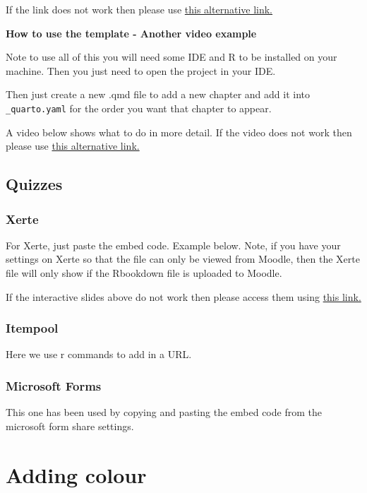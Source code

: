 \documentclass[
  letterpaper,
  oneside]{book}
\numberwithin{equation}{section}
\numberwithin{figure}{section}
\theoremstyle{break}
\theoremstyle{plain}
\theoremstyle{remark}
\begin{document}
If the link does not work then please use
\href{https://mediaspace.nottingham.ac.uk/media/How+to+get+the+embed+links/1_824b1mfn}{this
alternative link.}

\textbf{How to use the template - Another video example}

Note to use all of this you will need some IDE and R to be installed on
your machine. Then you just need to open the project in your IDE.

Then just create a new .qmd file to add a new chapter and add it into
\texttt{\_quarto.yaml} for the order you want that chapter to appear.

A video below shows what to do in more detail. If the video does not
work then please use
\href{https://mediaspace.nottingham.ac.uk/media/How+to+use+the+template/1_brjfqb44}{this
alternative link.}

\section{Quizzes}\label{quizzes}

\subsection{Xerte}\label{xerte}

For Xerte, just paste the embed code. Example below. Note, if you have
your settings on Xerte so that the file can only be viewed from Moodle,
then the Xerte file will only show if the Rbookdown file is uploaded to
Moodle.

If the interactive slides above do not work then please access them
using \href{https://www.nottingham.ac.uk/toolkits/play_25775}{this
link.}

\subsection{Itempool}\label{itempool}

Here we use r commands to add in a URL.

\subsection{Microsoft Forms}\label{microsoft-forms}

This one has been used by copying and pasting the embed code from the
microsoft form share settings.


\chapter{Adding colour}\label{adding-colour}
\end{document}
